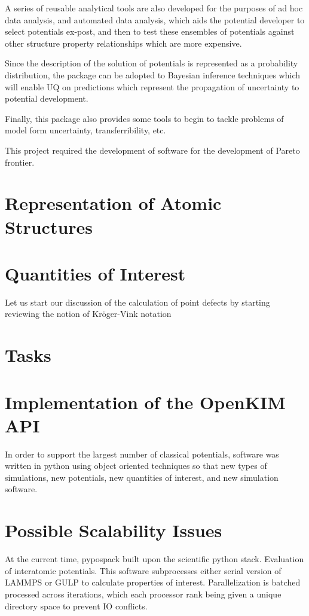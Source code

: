 A series of reusable analytical tools are also developed for the purposes of ad hoc data analysis, and automated data analysis, which aids the potential developer to select potentials ex-post, and then to test these ensembles of potentials against other structure property relationships which are more expensive.

Since the description of the solution of potentials is represented as a probability distribution, the package can be adopted to Bayesian inference techniques which will enable UQ on predictions which represent the propagation of uncertainty to potential development.

Finally, this package also provides some tools to begin to tackle problems of model form uncertainty, transferribility, etc.

This project required the development of software for the development of Pareto frontier.

\section{Representation of Atomic Structures}


\section{Quantities of Interest}

Let us start our discussion of the calculation of point defects by starting reviewing the notion of Kr\"oger-Vink notation\cite{kroger1956_notation}

\section{Tasks}


\section{Implementation of the OpenKIM API}

In order to support the largest number of classical potentials, software was written in python using object oriented techniques so that new types of simulations, new potentials, new quantities of interest, and new simulation software.

\section{Possible Scalability Issues}

At the current time, pypospack built upon the scientific python stack.
Evaluation of interatomic potentials.  This software subprocesses either serial version of LAMMPS or GULP to calculate properties of interest.  Parallelization is batched processed across iterations, which each processor rank being given a unique directory space to prevent IO conflicts.
